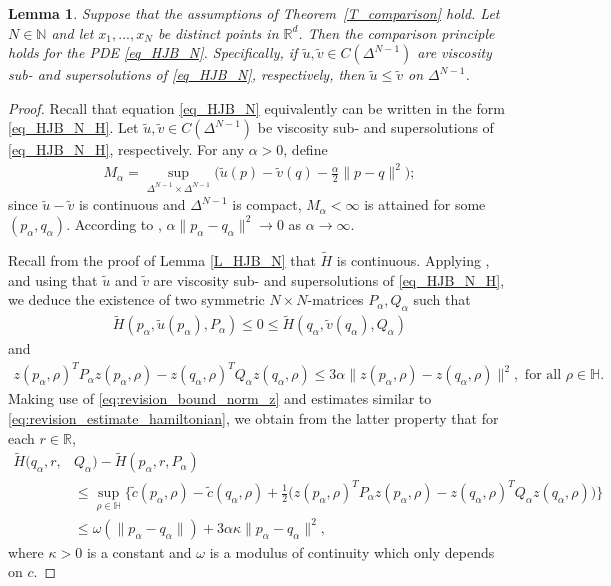 \documentclass{article}
\newtheorem{lemma}[theorem]{Lemma}
\theoremstyle{definition}
\numberwithin{equation}{section}
\numberwithin{theorem}{section}
\newcommand{\R}{\mathbb{R}}
\newcommand{\Hb}{\mathbb{H}}
\newcommand{\Nb}{\mathbb{N}}
\begin{document}
\begin{lemma}\label{L_comparison_N}
Suppose that the assumptions of Theorem~\ref{T_comparison} hold. Let $N\in\Nb$ and let $x_1,...,x_N$ be distinct points in ${\R^d}$. Then the comparison principle holds for the PDE \eqref{eq_HJB_N}. Specifically, if $\tilde u,\tilde v\in C(\Delta^{N-1})$ are viscosity sub- and supersolutions of \eqref{eq_HJB_N}, respectively, then $\tilde u\le \tilde v$ on $\Delta^{N-1}$. 
\end{lemma}

\begin{proof}
Recall that equation \eqref{eq_HJB_N} equivalently can be written in the form \eqref{eq_HJB_N_H}. Let $\tilde u,\tilde v\in C(\Delta^{N-1})$ be viscosity sub- and supersolutions of \eqref{eq_HJB_N_H}, respectively. For any $\alpha>0$, define
	\begin{align*}
		M_\alpha=\sup_{\Delta^{N-1}\times\Delta^{N-1}}
		\Big(\tilde u(p)-\tilde v(q)-\frac{\alpha}{2}\|p-q\|^2\Big);
	\end{align*}
since $\tilde u-\tilde v$ is continuous and $\Delta^{N-1}$ is compact, $M_\alpha<\infty$ is attained for some $(p_\alpha,q_\alpha)$. According to \cite[Lemma~3.1~(i)]{crandall1992}, $\alpha\|p_\alpha-q_\alpha\|^2\to 0$ as $\alpha\to\infty$. 
	
Recall from the proof of Lemma \ref{L_HJB_N} that $\tilde H$ is continuous. Applying \cite[Theorem~3.2; see also Remark~2.4 and equation~(3.10)]{crandall1992}, and using that $\tilde u$ and $\tilde v$ are viscosity sub- and supersolutions of \eqref{eq_HJB_N_H}, we deduce the existence of two symmetric $N\times N$-matrices $P_\alpha,Q_\alpha$ such that
	\begin{align}\label{eq_ellipticity_ishii}
		\tilde H\left(p_\alpha,\tilde u(p_\alpha),P_\alpha\right) 
		\le 0 \le 
		\tilde H\left(q_\alpha,\tilde v(q_\alpha),Q_\alpha\right)
	\end{align}
and
    \begin{align*}
        z(p_\alpha,\rho)^TP_\alpha z(p_\alpha,\rho)-z(q_\alpha,\rho)^TQ_\alpha z(q_\alpha,\rho)\le 3\alpha \|z(p_\alpha,\rho)-z(q_\alpha,\rho)\|^2,
        \textrm{ for all $\rho\in\Hb$}.
    \end{align*}
Making use of \eqref{eq:revision_bound_norm_z} and estimates similar to \eqref{eq:revision_estimate_hamiltonian}, we obtain from the latter property that for each $r\in\R$,
\begin{align}\label{eq_assump_comparison}
	\tilde H(q_\alpha,r, & Q_\alpha)-\tilde H(p_\alpha,r,P_\alpha)\nonumber\\
	&\le \sup_{\rho\in\Hb}\Big\{\tilde c(p_\alpha,\rho)-\tilde c(q_\alpha,\rho)+\frac12 \Big(z(p_\alpha,\rho)^TP_\alpha z(p_\alpha,\rho)-z(q_\alpha,\rho)^TQ_\alpha z(q_\alpha,\rho)\Big)\Big\}\nonumber\\
	&\le \omega(\|p_\alpha-q_\alpha\|)+3\alpha\kappa\|p_\alpha-q_\alpha\|^2,
\end{align}
where $\kappa>0$ is a constant and $\omega$ is a modulus of continuity which only depends on $c$. 


\end{proof}
\end{document}
